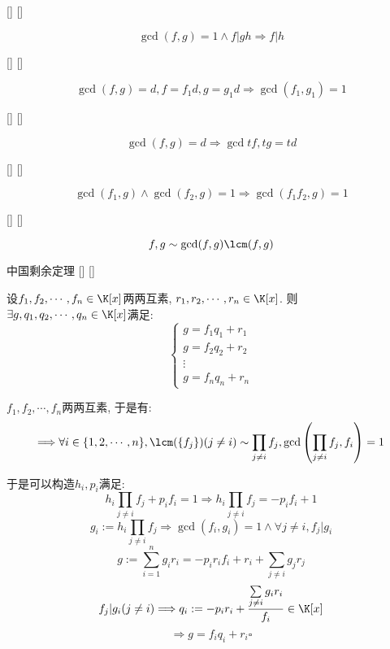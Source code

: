 \documentclass[UTF8]{ctexart}
\begin{document}
		\begin{ppt}
			[]
			{}
			[]
			[]
			
			\[\gcd(f,g)=1\wedge f|gh\Longrightarrow f|h\]
		\end{ppt}
		
		\begin{ppt}
			[]
			{}
			[]
			[]
			
			\[\gcd(f,g)=d, f=f_1 d, g=g_1 d\Longrightarrow \gcd(f_1,g_1)=1\]
		\end{ppt}
		
		\begin{ppt}
			[]
			{}
			[]
			[]
			
			\[\gcd(f,g)=d\Longrightarrow\gcd{tf,tg}=td\]
		\end{ppt}
		
		\begin{ppt}
			[]
			{}
			[]
			[]
			
			\[\gcd(f_1,g)\wedge\gcd(f_2,g)=1\Longrightarrow\gcd(f_1 f_2,g)=1\]
		\end{ppt}
		
		\begin{ppt}
			[]
			{}
			[]
			[]
			
			\[f,g\sim\gcd(f,g)\lcm(f,g)\]
		\end{ppt}
		
		\begin{thm}
			[]
			{中国剩余定理}
			[]
			[]
			
			设$f_1,f_2,\cdots,f_n\in\K[x]$两两互素, $r_1,r_2,\cdots,r_n\in\K[x]$. 则$\exists g,q_1,q_2,\cdots,q_n\in\K[x]$满足: 
			\[\begin{cases}
				g=f_1 q_1+r_1\\
				g=f_2 q_2+r_2\\
				\vdots\\
				g=f_n q_n+r_n
			\end{cases}\]
		\end{thm}
  
        \begin{prf}
			$f_1,f_2,\cdots,f_n$两两互素, 于是有: 
			\[\Longrightarrow\forall i\in\{1,2,\cdots,n\}, \lcm(\{f_j\})(j\neq i)\sim\prod\limits_{j\neq i}f_j, \gcd\left(\prod\limits_{j\neq i}f_j,f_i\right)=1\]

			于是可以构造$h_i,p_i$满足: 
			\[h_i\prod_{j\neq i}f_j+p_i f_i=1\Longrightarrow h_i\prod_{j\neq i}f_j=-p_i f_i+1\]
			\[g_i:=h_i\prod_{j\neq i}f_j\Longrightarrow\gcd(f_i,g_i)=1\wedge\forall j\neq i, f_j|g_i\]
			\[g:=\sum_{i=1}^n g_i r_i=-p_i r_i f_i+r_i+\sum_{j\neq i}g_j r_j\]
			\[f_j|g_i(j\neq i)\Longrightarrow q_i:=-p_i r_i+\frac{\sum\limits_{j\neq i}g_ir_i}{f_i}\in\K[x]\]
			\[\Longrightarrow g=f_i q_i+r_i\square\]
        \end{prf}
        
\end{document}
